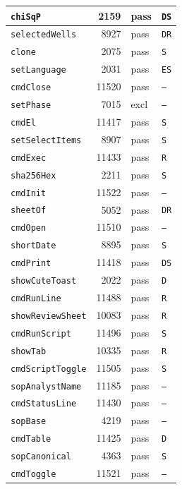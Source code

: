 {\begin{xltabular}{\linewidth}{|l|r|X|X|}
\texttt{chiSqP} & 2159 & pass & \texttt{DS} \\ \hline
\texttt{selectedWells} & 8927 & pass & \texttt{DR} \\ \hline
\texttt{clone} & 2075 & pass & \texttt{S} \\ \hline
\texttt{setLanguage} & 2031 & pass & \texttt{ES} \\ \hline
\texttt{cmdClose} & 11520 & pass & \texttt{--} \\ \hline
\texttt{setPhase} & 7015 & excl & \texttt{--} \\ \hline
\texttt{cmdEl} & 11417 & pass & \texttt{S} \\ \hline
\texttt{setSelectItems} & 8907 & pass & \texttt{S} \\ \hline
\texttt{cmdExec} & 11433 & pass & \texttt{R} \\ \hline
\texttt{sha256Hex} & 2211 & pass & \texttt{S} \\ \hline
\texttt{cmdInit} & 11522 & pass & \texttt{--} \\ \hline
\texttt{sheetOf} & 5052 & pass & \texttt{DR} \\ \hline
\texttt{cmdOpen} & 11510 & pass & \texttt{--} \\ \hline
\texttt{shortDate} & 8895 & pass & \texttt{S} \\ \hline
\texttt{cmdPrint} & 11418 & pass & \texttt{DS} \\ \hline
\texttt{showCuteToast} & 2022 & pass & \texttt{D} \\ \hline
\texttt{cmdRunLine} & 11488 & pass & \texttt{R} \\ \hline
\texttt{showReviewSheet} & 10083 & pass & \texttt{R} \\ \hline
\texttt{cmdRunScript} & 11496 & pass & \texttt{S} \\ \hline
\texttt{showTab} & 10335 & pass & \texttt{R} \\ \hline
\texttt{cmdScriptToggle} & 11505 & pass & \texttt{S} \\ \hline
\texttt{sopAnalystName} & 11185 & pass & \texttt{--} \\ \hline
\texttt{cmdStatusLine} & 11430 & pass & \texttt{--} \\ \hline
\texttt{sopBase} & 4219 & pass & \texttt{--} \\ \hline
\texttt{cmdTable} & 11425 & pass & \texttt{D} \\ \hline
\texttt{sopCanonical} & 4363 & pass & \texttt{S} \\ \hline
\texttt{cmdToggle} & 11521 & pass & \texttt{--} \\ \hline

\end{xltabular}}
